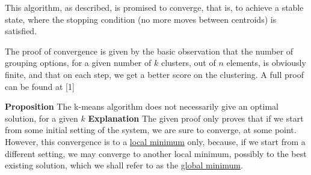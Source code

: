 \documentclass[12pt]{article}
\begin{document}
This algorithm, as described, is promised to converge, that is, to achieve a stable state, where the stopping condition (no more moves between centroids) is satisfied.

The proof of convergence is given by the basic observation that the number of grouping options, for a given number of $k$ clusters, out of \(n \) elements, is obviously finite, and that on each step, we get a better score on the clustering.
A full proof can be found at [1] \newline

\textbf{Proposition} The k-means algorithm does not necessarily give an optimal solution, for a given $k$\newline
\textbf{Explanation} The given proof only proves that if we start from some initial setting of the system, we are sure to converge, at some point. However, this convergence is to a \underline{local minimum} only, because, if we start from a different setting, we may converge to another local minimum, possibly to the best existing solution, which we shall refer to as the \underline{global minimum}. \newline
\end{document}
